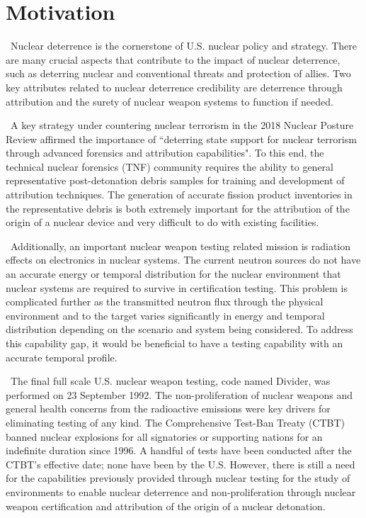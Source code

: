 
\section{Motivation}

\ Nuclear deterrence is the cornerstone of U.S. nuclear policy and strategy\cite{Defense2018}. There are many crucial aspects that contribute to the impact of nuclear deterrence, such as deterring nuclear and conventional threats and protection of allies. Two key attributes related to nuclear deterrence credibility are deterrence through attribution and the surety of nuclear weapon systems to function if needed. 

\ A key strategy under countering nuclear terrorism in the 2018 Nuclear Posture Review affirmed the importance of ``deterring state support for nuclear terrorism through advanced forensics and attribution capabilities"\cite{Defense2018}. To this end, the technical nuclear forensics (TNF) community requires the ability to general representative post-detonation debris samples for training and development of attribution techniques.  The generation of accurate fission product inventories in the representative debris is both extremely important for the attribution of the origin of a nuclear device and very difficult to do with existing facilities.

\ Additionally, an important nuclear weapon testing related mission is radiation effects on electronics in nuclear systems. The current neutron sources do not have an accurate energy or temporal distribution for the nuclear environment that nuclear systems are required to survive in certification testing. This problem is complicated further as the transmitted neutron flux through the physical environment and to the target varies significantly in energy and temporal distribution depending on the scenario and system being considered.  To address this capability gap, it would be beneficial to have a testing capability with an accurate temporal profile.

\ The final full scale U.S. nuclear weapon testing, code named Divider, was performed on 23 September 1992. The non-proliferation of nuclear weapons and general health concerns from the radioactive emissions were key drivers for eliminating testing of any kind. The Comprehensive Test-Ban Treaty (CTBT) banned nuclear explosions for all signatories or supporting nations for an indefinite duration since 1996. A handful of tests have been conducted after the CTBT's effective date; none have been by the U.S. However, there is still a need for the capabilities previously provided through nuclear testing for the study of environments to enable nuclear deterrence and non-proliferation through nuclear weapon certification and attribution of the origin of a nuclear detonation.

